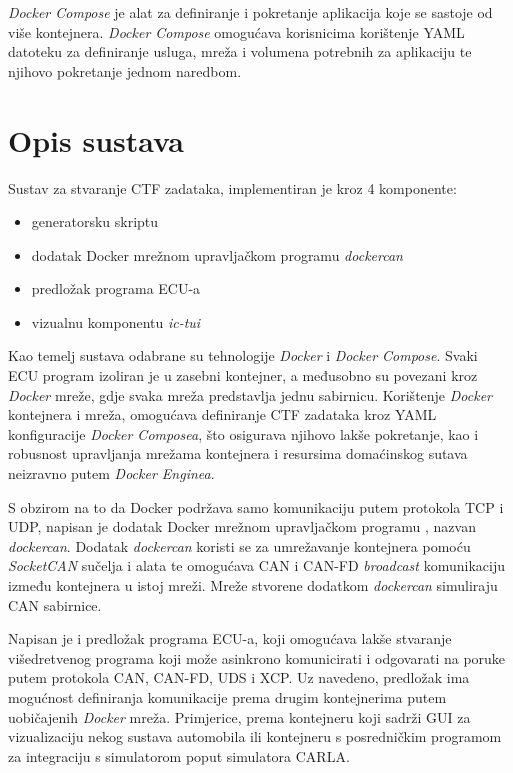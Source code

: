 \documentclass[times, utf8, diplomski, numeric]{fer}
\begin{document}
\textit{Docker Compose} je alat za definiranje i pokretanje aplikacija koje se sastoje od više kontejnera. \textit{Docker Compose} omogućava korisnicima korištenje YAML datoteku za definiranje usluga, mreža i volumena potrebnih za aplikaciju te njihovo pokretanje jednom naredbom.

\section{Opis sustava}
Sustav za stvaranje CTF zadataka, implementiran je kroz 4 komponente:
\begin{itemize}
    \item generatorsku skriptu
    \item dodatak Docker mrežnom upravljačkom programu \textit{dockercan}
    \item predložak programa ECU-a
    \item vizualnu komponentu \textit{ic-tui}
\end{itemize}

Kao temelj sustava odabrane su tehnologije \textit{Docker} i \textit{Docker Compose}. Svaki ECU program izoliran je u zasebni kontejner, a međusobno su povezani kroz \textit{Docker} mreže, gdje svaka mreža predstavlja jednu sabirnicu. Korištenje \textit{Docker} kontejnera i mreža, omogućava definiranje CTF zadataka kroz YAML konfiguracije \textit{Docker Composea}, što osigurava njihovo lakše pokretanje, kao i robusnost upravljanja mrežama kontejnera i resursima domaćinskog sutava neizravno putem \textit{Docker Enginea}.

S obzirom na to da Docker podržava samo komunikaciju putem protokola TCP i UDP, napisan je dodatak Docker mrežnom upravljačkom programu , nazvan \textit{dockercan}. Dodatak \textit{dockercan} koristi se za umrežavanje kontejnera pomoću \textit{SocketCAN} sučelja i alata te omogućava CAN i CAN-FD \textit{broadcast} komunikaciju između kontejnera u istoj mreži. Mreže stvorene dodatkom \textit{dockercan} simuliraju CAN sabirnice.

Napisan je i predložak programa ECU-a, koji omogućava lakše stvaranje višedretvenog programa koji može asinkrono komunicirati i odgovarati na poruke putem protokola CAN, CAN-FD, UDS i XCP. Uz navedeno, predložak ima mogućnost definiranja komunikacije prema drugim kontejnerima putem uobičajenih \textit{Docker} mreža. Primjerice, prema kontejneru koji sadrži GUI za vizualizaciju nekog sustava automobila ili kontejneru s posredničkim programom za integraciju s simulatorom poput simulatora CARLA.
\end{document}
